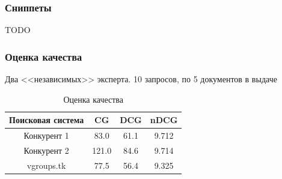 \documentclass{beamer}
\begin{document}
\begin{frame}
  \frametitle{Сниппеты}
    TODO
\end{frame}

\begin{frame}
  \frametitle{Оценка качества}
    Два <<независимых>> эксперта. 10 запросов, по 5 документов в выдаче
    \begin{center}
    \begin{table}[!htb]
      \begin{tabu}{|c|c|c|c|}
        \hline
        Поисковая система & CG    & DCG     & nDCG \\ \hline
        Конкурент 1       & 83.0  &  61.1   & 9.712  \\ \hline
        Конкурент 2       & 121.0 &  84.6   & 9.714   \\ \hline
        vgroups.tk        & 77.5  &  56.4   & 9.325   \\ \hline
      \end{tabu}
    \caption{Оценка качества}
    \end{table}
  \end{center}
\end{frame}
\end{document}
